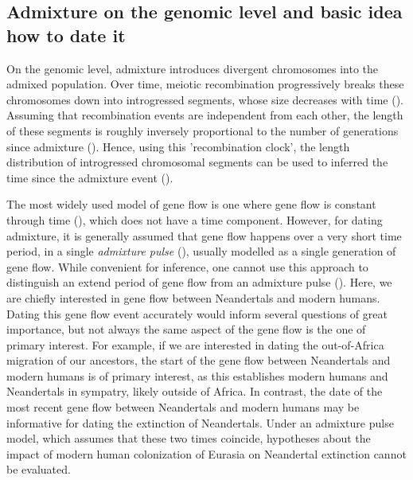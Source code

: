 \documentclass[]{article}
\begin{document}
\subsection{Admixture on the genomic level and basic idea how to date
it}\label{admixture-on-the-genomic-level-and-basic-idea-how-to-date-it}

On the genomic level, admixture introduces  divergent chromosomes
into the admixed population. Over time, meiotic recombination
progressively breaks these chromosomes down into introgressed segments, whose size decreases with time (\cite{falush_inference_2003}). 
Assuming that recombination events are
independent from each other, the length of these segments  is roughly inversely proportional to  the number of
generations since admixture
(\cite{moorjani_history_2011,pool_inference_2009,gravel_population_2012,liang_lengths_2014}).
Hence, using this 'recombination clock', the length distribution of introgressed chromosomal segments
 can be used to inferred the time since the
admixture event 
(\cite{moorjani_history_2011,pugach_dating_2011,sankararaman_date_2012,loh_inferring_2013,sankararaman_combined_2016,pugach_gateway_2018,jacobs_multiple_2019,hellenthal_genetic_2014}).

The most widely used model of gene flow is one where gene flow is constant through time (\cite{nielsen_distinguishing_2001,hey_multilocus_2004}), which does not have a time component. However, for dating admixture, it is generally assumed that gene flow
happens over a very short time period, in a single \textit{admixture pulse} (\cite{moorjani_history_2011}), usually modelled as a single generation
of gene flow. While convenient for inference, one cannot use this approach to distinguish an extend period of gene flow from an admixture pulse (\cite{pickrell_toward_2014}). Here, we are chiefly interested in gene flow between Neandertals and modern humans. Dating this gene flow event accurately would inform several questions of  great importance, but not always the same aspect of the gene flow is the one of primary interest. For example, if we are interested in dating the out-of-Africa migration of our ancestors, the start of the gene flow between Neandertals and modern humans is of primary interest, as this establishes modern humans and Neandertals in sympatry, likely outside of Africa.
In contrast, the date of the most recent gene flow between Neandertals and modern humans may be informative for dating the extinction of Neandertals. Under an admixture pulse model, which assumes that these two times coincide, hypotheses about the impact of modern human colonization of Eurasia on Neandertal extinction cannot be evaluated.
\end{document}
